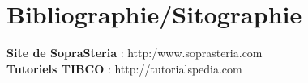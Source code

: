 \section*{Bibliographie/Sitographie}
\tab[0.42cm] \textbf{Site de SopraSteria  }: http:/www.soprasteria.com\\
\tab \textbf{Tutoriels TIBCO }: http://tutorialspedia.com\\
